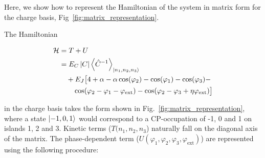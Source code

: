 \documentclass[%
superscriptaddress,
preprint,
preprintnumbers,
bibnotes,
amsmath,
amssymb,
aps,
showkeys,
prb,
]{revtex4-2}
\newcommand{\iket}[1]{\ensuremath{\Ket{#1}}}
\newcommand{\iabs}[1]{\ensuremath{\left|#1\right|}}
\newcommand{\iaverage}[1]{\ensuremath{\left\langle #1 \right\rangle}}
\begin{document}
\begin{framed}\noindent
  Here, we show how to represent the Hamiltonian of the system in matrix form for the charge basis, Fig~\ref{fig:matrix_representation}.
\end{framed}

\noindent The Hamiltonian

\begin{equation}
  \label{eq:hamitlian_revisited}
  \begin{aligned}
    \mathcal{H} & = T + U\\
    & = E_C \iabs{C} \iaverage{\hat{C}^{-1}}_{\iket{n_{1}, n_2, n_3}} \\
    & \quad+  E_J\big[4 + \alpha - \alpha\cos(\varphi_{2}) -\cos(\varphi_{1}) -\cos(\varphi_{3}) - \\
    &  \qquad  \cos(\varphi_{2}   -  \varphi_{1}  -  \varphi_{\text{ext}})  -  \cos(\varphi_{2}   -  \varphi_{3}  +
    \eta\varphi_{\text{ext}})\big]
  \end{aligned}
\end{equation}

\noindent in the charge basis  takes the  form  shown in  Fig.~\ref{fig:matrix_representation}, where a state \iket{-1, 0,  1} would correspond to a CP-occupation of -1, 0 and 1 on islands 1, 2 and 3. Kinetic terms  ($ {T}(n_1, n_2, n_3  $) naturally  fall on  the diagonal  axis of  the matrix. The phase-dependent term ($ U(\varphi_1,\varphi_2,\varphi_3,\varphi_{\text{ext}})  $) are represented using the following procedure:
\end{document}
